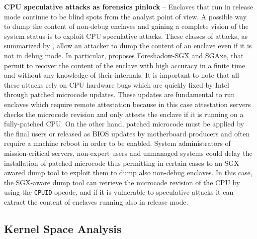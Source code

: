 
\vspace{0.2cm}
\noindent \textbf{CPU speculative attacks as forensics pinlock} --
Enclaves that run in release mode continue to be blind spots from the analyst
point of view. A possible way to dump the content of non-debug enclaves and
gaining a complete vision of the system status is to exploit CPU speculative
attacks. These classes of attacks, as summarized by \cite{nilsson2020survey},
allow an attacker to dump the content of an enclave even if it is not in debug
mode. In particular, \cite{vanbulck2018foreshadow} proposes 
Foreshadow-SGX and \cite{sgaxe} SGAxe, that permit to recover the content of 
the enclave with high accuracy in a finite time and without any knowledge of 
their internals. It is
important to note that all these attacks rely on CPU hardware bugs which are
quickly fixed by Intel through patched microcode updates. These updates are
fundamental to run enclaves which require remote attestation because in this
case attestation servers checks the microcode revision and only attests the
enclave if it is running on a fully-patched CPU. On the other hand, patched
microcode must be applied by the final users or released as BIOS updates by
motherboard producers and often require a machine reboot in order to be
enabled. System administrators of mission-critical servers, non-expert users and
unmanaged systems could delay the installation of patched microcode thus
permitting in certain cases to an SGX awared dump tool to exploit them to dump
also non-debug enclaves. In this case, the SGX-aware dump tool
can retrieve the microcode revision of the CPU by using the \texttt{CPUID} 
opcode, and if it is vulnerable to speculative attacks it can extract the 
content of enclaves running also in release mode.

\subsection{Kernel Space Analysis}
\label{ssec:kernel-space-analysis}

